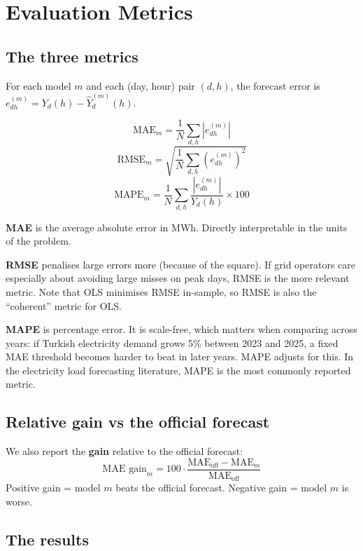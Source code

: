 \documentclass[11pt,a4paper]{article}
\begin{document}
\section{Evaluation Metrics}

\subsection{The three metrics}

For each model $m$ and each (day, hour) pair $(d,h)$, the forecast
error is $e_{dh}^{(m)} = Y_d(h) - \hat{Y}_d^{(m)}(h)$.

\[
\text{MAE}_m = \frac{1}{N}\sum_{d,h} |e_{dh}^{(m)}|
\]
\[
\text{RMSE}_m = \sqrt{\frac{1}{N}\sum_{d,h} (e_{dh}^{(m)})^2}
\]
\[
\text{MAPE}_m = \frac{1}{N}\sum_{d,h} \frac{|e_{dh}^{(m)}|}{Y_d(h)} \times 100
\]

\textbf{MAE} is the average absolute error in MWh. Directly
interpretable in the units of the problem.

\textbf{RMSE} penalises large errors more (because of the square).
If grid operators care especially about avoiding large misses on peak
days, RMSE is the more relevant metric. Note that OLS minimises RMSE
in-sample, so RMSE is also the ``coherent'' metric for OLS.

\textbf{MAPE} is percentage error. It is scale-free, which matters
when comparing across years: if Turkish electricity demand grows 5\%
between 2023 and 2025, a fixed MAE threshold becomes harder to beat
in later years. MAPE adjusts for this. In the electricity load
forecasting literature, MAPE is the most commonly reported metric.

\subsection{Relative gain vs the official forecast}

We also report the \textbf{gain} relative to the official forecast:
\[
\text{MAE gain}_m = 100 \cdot \frac{\text{MAE}_{\text{off}} - \text{MAE}_m}{\text{MAE}_{\text{off}}}
\]
Positive gain = model $m$ beats the official forecast. Negative gain =
model $m$ is worse.

\subsection{The results}
\end{document}
